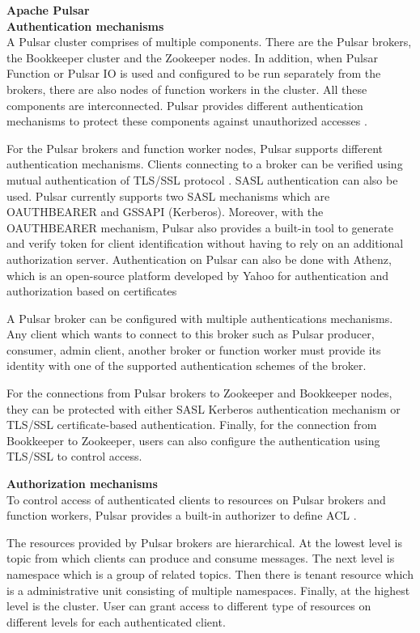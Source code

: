 \large \textbf{Apache Pulsar}\\
\normalsize
\textbf{Authentication mechanisms}\\
A Pulsar cluster comprises of multiple components. There are the Pulsar brokers, the Bookkeeper cluster and the Zookeeper nodes. In addition, when Pulsar Function or Pulsar IO is used and configured to be run separately from the brokers, there are also nodes of function workers in the cluster. All these components are interconnected. Pulsar provides different authentication mechanisms to protect these components against unauthorized accesses \cite{pulsarsecurity}.

For the Pulsar brokers and function worker nodes, Pulsar supports different authentication mechanisms. Clients connecting to a broker can be verified using mutual authentication of TLS/SSL protocol \cite{tls}. SASL authentication \cite{sasl} can also be used. Pulsar currently supports two SASL mechanisms which are OAUTHBEARER and GSSAPI (Kerberos). Moreover, with the OAUTHBEARER mechanism, Pulsar also provides a built-in tool to generate and verify token for client identification without having to rely on an additional authorization server. Authentication on Pulsar can also be done with Athenz, which is an open-source platform developed by Yahoo for authentication and authorization based on certificates

A Pulsar broker can be configured with multiple authentications mechanisms. Any client which wants to connect to this broker such as Pulsar producer, consumer, admin client, another broker or function worker must provide its identity with one of the supported authentication schemes of the broker. 

For the connections from Pulsar brokers to Zookeeper and Bookkeeper nodes, they can be protected with either SASL Kerberos authentication mechanism or TLS/SSL certificate-based authentication. Finally, for the connection from Bookkeeper to Zookeeper, users can also configure the authentication using TLS/SSL to control access.

\textbf{Authorization mechanisms}\\
To control access of authenticated clients to resources on Pulsar brokers and function workers, Pulsar provides a built-in authorizer to define ACL \cite{pulsarsecurity}.

The resources provided by Pulsar brokers are hierarchical. At the lowest level is topic from which clients can produce and consume messages. The next level is namespace which is a group of related topics. Then there is tenant resource which is a administrative unit consisting of multiple namespaces. Finally, at the highest level is the cluster. User can grant access to different type of resources on different levels for each authenticated client.

